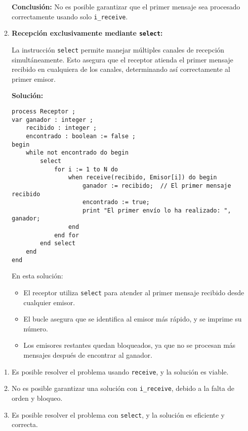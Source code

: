 \documentclass[a4paper,12pt]{article}
\begin{document}
\begin{enumerate}[label=\alph*)]
\textbf{Conclusión:} No es posible garantizar que el primer mensaje sea procesado correctamente usando solo \texttt{i\_receive}.

\item \textbf{ Recepción exclusivamente mediante \texttt{select}:}

La instrucción \texttt{select} permite manejar múltiples canales de recepción simultáneamente. Esto asegura que el receptor atienda el primer mensaje recibido en cualquiera de los canales, determinando así correctamente al primer emisor.

\textbf{Solución:}

\begin{lstlisting}[style=customcpp]
process Receptor ;
var ganador : integer ;
    recibido : integer ;
    encontrado : boolean := false ;
begin
    while not encontrado do begin
        select
            for i := 1 to N do
                when receive(recibido, Emisor[i]) do begin
                    ganador := recibido;  // El primer mensaje recibido
                    encontrado := true;
                    print "El primer envío lo ha realizado: ", ganador;
                end
            end for
        end select
    end
end
\end{lstlisting}

En esta solución:
\begin{itemize}
    \item El receptor utiliza \texttt{select} para atender al primer mensaje recibido desde cualquier emisor.
    \item El bucle asegura que se identifica al emisor más rápido, y se imprime su número.
    \item Los emisores restantes quedan bloqueados, ya que no se procesan más mensajes después de encontrar al ganador.
\end{itemize}

\end{enumerate}

\begin{tcolorbox}[colback=gray!5!white,colframe=gray!75!black,title=\textbf{Resumen:}]

  \begin{enumerate}[label=\alph*)]
    \item Es posible resolver el problema usando \texttt{receive}, y la solución es viable.
    \item No es posible garantizar una solución con \texttt{i\_receive}, debido a la falta de orden y bloqueo.
    \item Es posible resolver el problema con \texttt{select}, y la solución es eficiente y correcta.
  \end{enumerate}
\end{tcolorbox}
\end{document}
